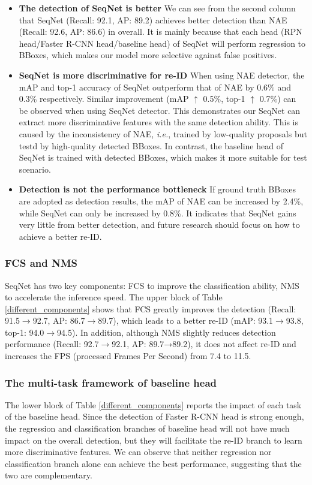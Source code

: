 \documentclass[letterpaper]{article} \usepackage{aaai21}  \usepackage{times}  \usepackage{helvet} \usepackage{courier}  \usepackage[hyphens]{url}  \usepackage{graphicx} \urlstyle{rm} \def\UrlFont{\rm}  \usepackage{natbib}  \usepackage{caption} \usepackage{multirow}
\begin{document}
\begin{itemize}
    \item \textbf{The detection of SeqNet is better} We can see from the second column that SeqNet (Recall: 92.1, AP: 89.2) achieves better detection than NAE (Recall: 92.6, AP: 86.6) in overall. It is mainly because that each head (RPN head/Faster R-CNN head/baseline head) of SeqNet will perform regression to BBoxes, which makes our model more selective against false positives.
    \item \textbf{SeqNet is more discriminative for re-ID} When using NAE detector, the mAP and top-1 accuracy of SeqNet outperform that of NAE by 0.6\% and 0.3\% respectively. Similar improvement (mAP $\uparrow$ 0.5\%, top-1 $\uparrow$ 0.7\%) can be observed when using SeqNet detector. This demonstrates our SeqNet can extract more discriminative features with the same detection ability. This is caused by the inconsistency of NAE, \textit{i.e.}, trained by low-quality proposals but testd by high-quality detected BBoxes. In contrast, the baseline head of SeqNet is trained with detected BBoxes, which makes it more suitable for test scenario.
    \item \textbf{Detection is not the performance bottleneck} If ground truth BBoxes are adopted as detection results, the mAP of NAE can be increased by 2.4\%, while SeqNet can only be increased by 0.8\%. It indicates that SeqNet gains very little from better detection, and future research should focus on how to achieve a better re-ID.
\end{itemize}

\subsubsection{FCS and NMS}
SeqNet has two key components: FCS to improve the classification ability, NMS to accelerate the inference speed. The upper block of Table \ref{different_components} shows that FCS greatly improves the detection (Recall: 91.5$\rightarrow$92.7, AP: 86.7$\rightarrow$89.7), which leads to a better re-ID (mAP: 93.1$\rightarrow$93.8, top-1: 94.0$\rightarrow$94.5). In addition, although NMS slightly reduces detection performance (Recall: 92.7$\rightarrow$92.1, AP: 89.7→89.2), it does not affect re-ID and increases the FPS (processed Frames Per Second) from 7.4 to 11.5.

\subsubsection{The multi-task framework of baseline head}
The lower block of Table \ref{different_components} reports the impact of each task of the baseline head. Since the detection of Faster R-CNN head is strong enough, the regression and classification branches of baseline head will not have much impact on the overall detection, but they will facilitate the re-ID branch to learn more discriminative features. We can observe that neither regression nor classification branch alone can achieve the best performance, suggesting that the two are complementary.
\end{document}
